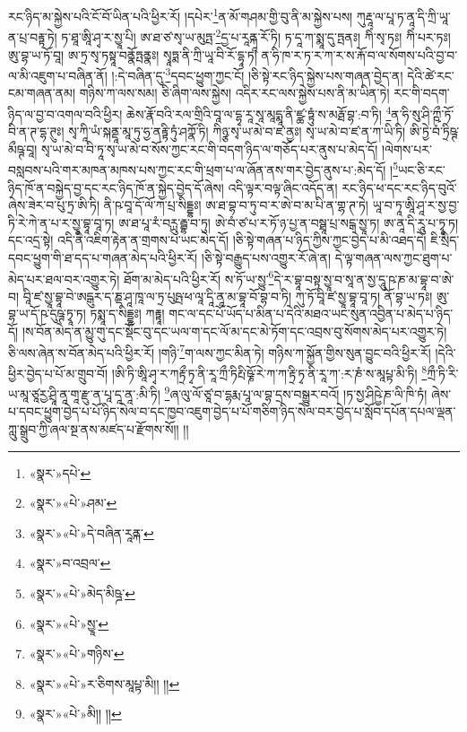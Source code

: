 རང་ཉིད་མ་སྐྱེས་པའི་ངོ་བོ་ཡིན་པའི་ཕྱིར་རོ། །དཔེར་\footnote{«སྣར་»དཔེ་}ན་མོ་གཤམ་གྱི་བུ་ནི་མ་སྐྱེས་པས། ཀུརྡཱ་ལ་པཱ་ཏ་ནཱ་དི་ཀྲི་ཡཱ་ན་པྲ་བརྟྟ་ཏེ། ཏ་ཐཱ་ཨཱི་ཤྭ་ར་སྱཱ་པི། ཨ་ཐ་ཙ་སྭ་ཡ་མུཏྤ་\footnote{«སྣར་»«པེ་»ཤམ་}དྱ་པ་རཱནྐཱ་རོ་ཏི། ཏ་དཱ་ཀ་སྨཱ་དུ་ཏྤནཿ། ཀིཾ་སྭ་ཏཿ། ཀིཾ་པར་ཏཿ། ཨུ་བྷ་ཡ་ཏོ་བཱ། ཨ་ཏྲ་སྭ་ཏསྟཱ་བནྣོཏྤནྣཿ། སྭཱཏྨ་ནི་ཀྲི་ཡཱ་བི་རོ་དྷཱ་ཏ། ན་ཧི་ཁ་ར་ཏ་ར་ཀ་ར་ས་རྐོ་བ་ལ་སོགས་པའི་བྱ་བ་ལ་མི་འཇུག་པ་བཞིན་ནོ། །:དེ་བཞིན་དུ་\footnote{«སྣར་»«པེ་»དེ་བཞིན་རཱནྐ་}དབང་ཕྱུག་ཀྱང་ངོ། །ཅི་སྟེ་རང་ཉིད་སྐྱེས་པས་གཞན་བྱེད་ན། དེའི་ཚེ་རང་ངམ་གཞན་ནམ། གཉིས་ཀ་ལས་སམ། ཅི་ཞིག་ལས་སྐྱེས། འདིར་རང་ལས་སྐྱེས་པས་ནི་མ་ཡིན་ཏེ། རང་གི་བདག་ཉིད་ལ་བྱ་བ་འགལ་བའི་ཕྱིར། ཆེས་རྣོ་བའི་རལ་གྲིའི་བཱ་ལ་དྷྭ་རཱ་སཱ་མཱདྨཱ་ནི་ཛྪ་ཏྟུཾ་ས་མརྠོ་བྷ་:བ་ཏི། \footnote{«སྣར་»བ་འབྲལ་}ན་ཧི་སུ་ཤི་ཀྵྀ་ཏོ་བི་ན་ཊ་དྷ་ཊུཿ། སྭ་ཀཱི་ཡཾ་སྐནྡཱ་མཱ་ཏུ་ཧྱ་ནརྟྟི་ཏུཾ་ཤཀྣོ་ཏི། ཀིཉྩ་སྭ་ཡ་མེ་བ་ཛ་ནྱཿ། སྭ་ཡ་མེ་བ་ཛ་ན་ཀ་ཡི་ཏི། ཨི་ཏྱེ་བཾ་ཏྲིཥྚ་མྀཥྚ་བཱ། སྭ་ཡ་མེ་བ་བི་ཏཱ་སྭ་ཡ་མེ་བ་སོས་ཀྱང་རང་གི་བདག་ཉིད་ལ་གཅོད་པར་ནུས་པ་མེད་དོ། །ལེགས་པར་བསླབས་པའི་གར་མཁན་མཁས་པས་ཀྱང་རང་གི་ཕྲག་པ་ལ་ཞོན་ནས་གར་བྱེད་ནུས་པ་:མེད་དོ། །\footnote{«སྣར་»«པེ་»མེད་མིཥྜ་}ཡང་ཅི་རང་ཉིད་ཁོ་ན་བསྐྱེད་བྱ་དང་རང་ཉིད་ཁོ་ན་སྐྱེད་བྱེད་དོ་ཞེས། འདི་ལྟར་བལྟ་ཞིང་འདོད་ན། རང་ཉིད་ཕ་དང་རང་ཉིད་བུའོ་ཞེས་ཟེར་བ་པུ་ཏྲ་ཨི་ཏི། ནི་ཥ་བཱ་དོ་ལོ་ཀ་པྲ་སིདྡྷཿ། ཨ་ཐ་བྷ་བ་ཏུ་བ་ར་ཨེ་བ་མ་པི་ན་གྷ་ཊ་ཏེ། ཡཱ་བ་ཏཱ་ཨཱི་ཤཱ་ར་སྱ་བྱ་ཏི་རེ་ཀེ་ན་པ་ར་སྱཱ་བྷཱ་བཱ་ཏ། ཨ་ཐ་པཱ་རཾ་བཪྻུ་རྦྷ་བ་ཏུ། ཨེ་བཾ་ཙ་པ་ར་ཏོ་ཉ་པྱ་ན་བསྠཱ་པྲ་སངྒ་སྱཱ་ཏ། ཨ་ནཱ་དི་རཱུ་པ་ཏྭཱ་ཏ། དང་འདྲ་སྟེ། འདི་ནི་འཇིག་རྟེན་ན་གྲགས་པ་ཡང་མེད་དོ། །ཅི་སྟེ་གཞན་པ་ཉིད་ཀྱིས་ཀྱང་བྱེད་པ་མི་འཐད་དེ། ཇི་སྲིད་དབང་ཕྱུག་གི་ཐ་དད་པ་གཞན་མེད་པའི་ཕྱིར་རོ། །ཅི་སྟེ་བརྒྱུད་པས་འགྱུར་རོ་ཞེ་ན། དེ་ལྟ་གཞན་ལས་ཀྱང་ཐུག་པ་མེད་པར་ཐལ་བར་འགྱུར་ཏེ། ཐོག་མ་མེད་པའི་ཕྱིར་རོ། ས་ཏོ་ཡ་སྱུ་\footnote{«སྣར་»«པེ་»སྱཱ་}དེ་ར་བྷཱ་བསྟ་སྱཱ་བ་སཱ་ན་སྱ་དཱུ་ཥ་ཎ་མ་བྷཱ་བ་ཨེ་བ། བཱི་ཛ་སྱཱ་བྷཱ་བེ་ཨདྒུར་ད་ཎྡ་ཤཱ་ཁཱ་ལ་ཏྲ་པུཥྤ་ཕ་ལཱ་དཱི་ནཱ་མ་བྷཱ་བོ་བྷ་བ་ཏི། ཀུ་ཏོ་བཱི་ཛ་སྱཱ་བྷཱ་བཱ་ཏ། ནོ་བྷ་ཡ་ཏཿ། ཨུ་བྷ་ཡ་དོ་ཥ་དུཥྚ་ཏྭཱ་ཏ། ཏསྨཱ་ད་སིདྡྷཿ། ཀརྟྟཱ། གང་ལ་དང་པོ་ཡོད་པ་མིན་པ་དེའི་མཐའ་ཡང་སུན་འབྱིན་པ་མེད་པ་ཉིད་དོ། །ས་བོན་མེད་ན་མྱུ་གུ་དང་སྡོང་བུ་དང་ཡལ་ག་དང་ལོ་མ་དང་མེ་ཏོག་དང་འབྲས་བུ་སོགས་མེད་པར་འགྱུར་ཏེ། ཅི་ལས་ཞེན་ས་བོན་མེད་པའི་ཕྱིར་རོ། །གཉི་\footnote{«སྣར་»«པེ་»གཉིས་}ག་ལས་ཀྱང་མིན་ཏེ། གཉིས་ཀ་སྐྱོན་གྱིས་སུན་བྱུང་བའི་ཕྱིར་རོ། །དེའི་ཕྱིར་བྱེད་པ་པོ་མ་གྲུབ་བོ། །ཨི་ཏི་ཨཱི་ཤྭ་ར་ཀརྟྲྀ་ཏྭ་ནི་རཱ་ཀྲྀ་ཏིརྤི་ཥྞོ་རེ་ཀ་ཀ་རྟྲི་ཏྭ་ནི་རཱ་ཀ་:ར་ཎཾ་ས་མཱཔྟ་མི་ཏི། \footnote{«སྣར་»«པེ་»ར་ཅིགས་མཱཔྟ་མི།། །། }ཀྲྀ་ཏི་རི་ཡ་མཱ་ཙཱརྱ་ཤྲཱི་ནཱ་གཱ་རྫུ་ན་པཱ་དཱ་ནཱ་:མི་ཏི། \footnote{«སྣར་»«པེ་»མི།། །། }ཞ་ལུ་ལོ་ཙཱ་བ་དྷརྨ་པཱ་ལ་བྷ་དྲས་བསྒྱུར་བའོ། །ཏ་སྱ་ཤིཥྱེ་ཎ་ལི་ཁི་ཏཾ། ཞེས་པ་དབང་ཕྱུག་བྱེད་པ་པོ་ཉིད་སེལ་བ་དང་ཁྱབ་འཇུག་བྱེད་པ་པོ་གཅིག་ཉིད་སེལ་བར་བྱེད་པ་སློབ་དཔོན་དཔལ་ལྡན་ཀླུ་སྒྲུབ་ཀྱི་ཞལ་སྔ་ནས་མཛད་པ་རྫོགས་སོ།། །།